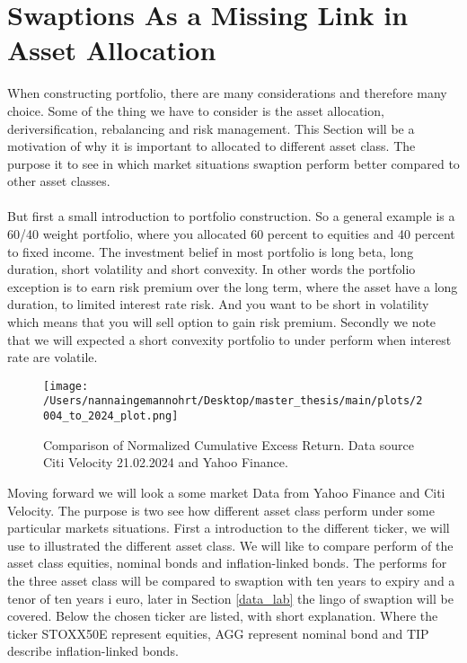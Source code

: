 \section{Swaptions As a Missing Link in Asset Allocation}
When constructing portfolio, there are many considerations and therefore many choice. 
Some of the thing we have to consider is the asset allocation, deriversification, rebalancing 
and risk management. This Section will be a motivation of why it is important to 
allocated to different asset class. The purpose it to see in which market situations
swaption perform better compared to other asset classes.
\\\\
But first a small introduction to portfolio construction. 
So a general  example is a 60/40 weight portfolio, where you allocated 60 percent to equities 
and 40 percent to fixed income. 
The investment belief in most portfolio is long beta, long duration, short volatility and short 
convexity. In other words the portfolio exception is to earn risk premium over the long term, 
where the asset have a long duration, to limited interest rate risk. And you want to be short in
volatility which means that you will sell option to gain risk premium. Secondly we note that we will expected 
a short convexity portfolio to under perform when interest rate are volatile. 
\begin{figure}[H]
    \centering
    \texttt{[image: /Users/nannaingemannohrt/Desktop/master\_thesis/main/plots/2004\_to\_2024\_plot.png]}
    \caption{Comparison of Normalized Cumulative Excess Return. Data source Citi Velocity 21.02.2024 
    and Yahoo Finance.}
    \label{fig:2004_2024}
\end{figure}
\noindent
Moving forward we will look a some market Data from Yahoo Finance and Citi Velocity. 
The purpose is two see how different asset class perform under some particular markets situations.
First a introduction to the different ticker, we will use to illustrated the different asset class. 
We will like to compare perform of the asset class equities, nominal bonds and inflation-linked bonds. 
The performs for the three asset class will be compared to swaption with ten years to expiry and a tenor
of ten years i euro, later in Section \ref{data_lab} the lingo of swaption will be covered. 
Below the chosen ticker are listed, with short explanation. Where the ticker STOXX50E represent equities, 
AGG represent nominal bond and TIP describe inflation-linked bonds.

